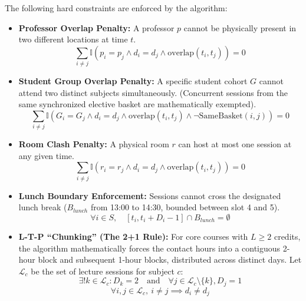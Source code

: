 The following hard constraints are enforced by the algorithm:
\begin{itemize}
    \item \textbf{Professor Overlap Penalty:} A professor $p$ cannot be physically present in two different locations at time $t$. 
    \begin{equation}
        \sum_{i \neq j} \mathbb{I}(p_i = p_j \land d_i = d_j \land \text{overlap}(t_i, t_j)) = 0
    \end{equation}

    \item \textbf{Student Group Overlap Penalty:} A specific student cohort $G$ cannot attend two distinct subjects simultaneously. (Concurrent sessions from the same synchronized elective basket are mathematically exempted).
    \begin{equation}
        \sum_{i \neq j} \mathbb{I}(G_i = G_j \land d_i = d_j \land \text{overlap}(t_i, t_j) \land \neg \text{SameBasket}(i, j)) = 0
    \end{equation}


    \item \textbf{Room Clash Penalty:} A physical room $r$ can host at most one session at any given time.
    \begin{equation}
        \sum_{i \neq j} \mathbb{I}(r_i = r_j \land d_i = d_j \land \text{overlap}(t_i, t_j)) = 0
    \end{equation}

    \item \textbf{Lunch Boundary Enforcement:} Sessions cannot cross the designated lunch break ($B_{lunch}$ from 13:00 to 14:30, bounded between slot 4 and 5). 
    \begin{equation}
        \forall i \in S, \quad [t_i, t_i + D_i - 1] \cap B_{lunch} = \emptyset
    \end{equation}

    \item \textbf{L-T-P ``Chunking'' (The 2+1 Rule):} For core courses with $L \ge 2$ credits, the algorithm mathematically forces the contact hours into a contiguous 2-hour block and subsequent 1-hour blocks, distributed across distinct days. Let $\mathcal{L}_c$ be the set of lecture sessions for subject $c$:
    \begin{equation}
        \exists! k \in \mathcal{L}_c : D_k = 2 \quad \text{and} \quad \forall j \in \mathcal{L}_c \setminus \{k\}, D_j = 1
    \end{equation}
    \begin{equation}
        \forall i, j \in \mathcal{L}_c, \ i \neq j \implies d_i \neq d_j
    \end{equation}
\end{itemize}

